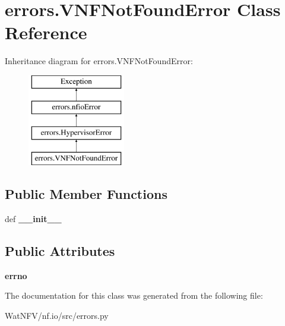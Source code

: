 \hypertarget{classerrors_1_1VNFNotFoundError}{\section{errors.\-V\-N\-F\-Not\-Found\-Error Class Reference}
\label{classerrors_1_1VNFNotFoundError}
}
Inheritance diagram for errors.\-V\-N\-F\-Not\-Found\-Error\-:\begin{figure}[H]
\begin{center}
\leavevmode
\includegraphics[height=4.000000cm]{classerrors_1_1VNFNotFoundError}
\end{center}
\end{figure}
\subsection*{Public Member Functions}
\begin{DoxyCompactItemize}
\item 
\hypertarget{classerrors_1_1VNFNotFoundError_a929f3afe0fed32e5a0d345fed81583ba}{def {\bfseries \-\_\-\-\_\-init\-\_\-\-\_\-}}\label{classerrors_1_1VNFNotFoundError_a929f3afe0fed32e5a0d345fed81583ba}

\end{DoxyCompactItemize}
\subsection*{Public Attributes}
\begin{DoxyCompactItemize}
\item 
\hypertarget{classerrors_1_1VNFNotFoundError_a972c73f0a6d8a4f4f4abbb54b4da9df5}{{\bfseries errno}}\label{classerrors_1_1VNFNotFoundError_a972c73f0a6d8a4f4f4abbb54b4da9df5}

\end{DoxyCompactItemize}


The documentation for this class was generated from the following file\-:\begin{DoxyCompactItemize}
\item 
Wat\-N\-F\-V/nf.\-io/src/errors.\-py\end{DoxyCompactItemize}
